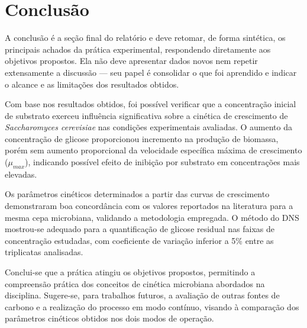 
\section{Conclusão}

A conclusão é a seção final do relatório e deve retomar, de forma sintética, os principais achados da prática experimental, respondendo diretamente aos objetivos propostos. Ela não deve apresentar dados novos nem repetir extensamente a discussão — seu papel é consolidar o que foi aprendido e indicar o alcance e as limitações dos resultados obtidos.

Com base nos resultados obtidos, foi possível verificar que a concentração inicial de substrato exerceu influência significativa sobre a cinética de crescimento de \textit{Saccharomyces cerevisiae} nas condições experimentais avaliadas. O aumento da concentração de glicose proporcionou incremento na produção de biomassa, porém sem aumento proporcional da velocidade específica máxima de crescimento ($\mu_{max}$), indicando possível efeito de inibição por substrato em concentrações mais elevadas.

Os parâmetros cinéticos determinados a partir das curvas de crescimento demonstraram boa concordância com os valores reportados na literatura para a mesma cepa microbiana, validando a metodologia empregada. O método do DNS mostrou-se adequado para a quantificação de glicose residual nas faixas de concentração estudadas, com coeficiente de variação inferior a 5\% entre as triplicatas analisadas.

Conclui-se que a prática atingiu os objetivos propostos, permitindo a compreensão prática dos conceitos de cinética microbiana abordados na disciplina. Sugere-se, para trabalhos futuros, a avaliação de outras fontes de carbono e a realização do processo em modo contínuo, visando à comparação dos parâmetros cinéticos obtidos nos dois modos de operação.

